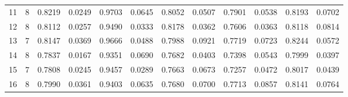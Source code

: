 \begin{tabular}{rrrrrrrrrrrr}
        11 &     8 &   0.8219 & 0.0249 &               0.9703 & 0.0645 &                   0.8052 & 0.0507 &               0.7901 & 0.0538 &                       0.8193 & 0.0702 \\
        12 &     8 &   0.8112 & 0.0257 &               0.9490 & 0.0333 &                   0.8178 & 0.0362 &               0.7606 & 0.0363 &                       0.8118 & 0.0814 \\
        13 &     7 &   0.8147 & 0.0369 &               0.9666 & 0.0488 &                   0.7988 & 0.0921 &               0.7719 & 0.0723 &                       0.8244 & 0.0572 \\
        14 &     8 &   0.7837 & 0.0167 &               0.9351 & 0.0690 &                   0.7682 & 0.0403 &               0.7398 & 0.0543 &                       0.7999 & 0.0397 \\
        15 &     7 &   0.7808 & 0.0245 &               0.9457 & 0.0289 &                   0.7663 & 0.0673 &               0.7257 & 0.0472 &                       0.8017 & 0.0439 \\
        16 &     8 &   0.7990 & 0.0361 &               0.9403 & 0.0635 &                   0.7680 & 0.0700 &               0.7713 & 0.0857 &                       0.8141 & 0.0764 \\
\bottomrule
\end{tabular}
